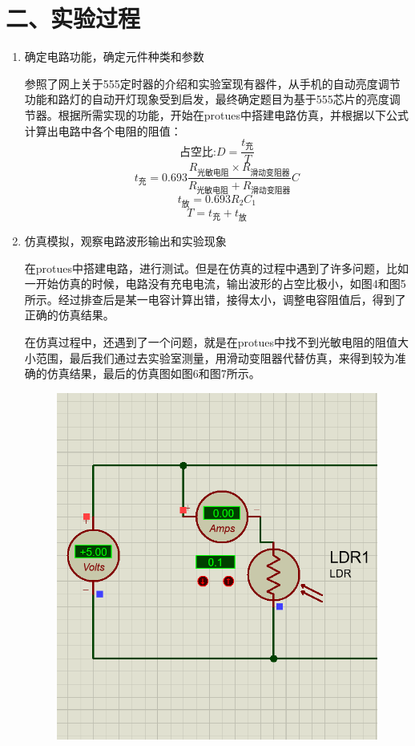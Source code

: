 \documentclass[a4paper,12pt]{article}
\begin{document}
	\section*{二、实验过程}
	\begin{enumerate}
		\item 确定电路功能，确定元件种类和参数\par 
		\qquad 参照了网上关于555定时器的介绍和实验室现有器件，从手机的自动亮度调节功能和路灯的自动开灯现象受到启发，最终确定题目为基于555芯片的亮度调节器。根据所需实现的功能，开始在protues中搭建电路仿真，并根据以下公式计算出电路中各个电阻的阻值：
		$$\mbox{占空比:}D=\frac{t_{\mbox{充}}}{T}$$
		$$t_{\mbox{充}}=0.693\frac{R_{\mbox{光敏电阻}} \times R_{\mbox{滑动变阻器}}}{R_{\mbox{光敏电阻}}+R_{\mbox{滑动变阻器}}}C$$
		\hspace{0.2cm}
		$$t_{\mbox{放}}=0.693R_2C_1$$
		$$T=t_{\mbox{充}}+t_{\mbox{放}}$$
		\item 仿真模拟，观察电路波形输出和实验现象\par 
		\qquad 在protues中搭建电路，进行测试。但是在仿真的过程中遇到了许多问题，比如一开始仿真的时候，电路没有充电电流，输出波形的占空比极小，如图4和图5所示。经过排查后是某一电容计算出错，接得太小，调整电容阻值后，得到了正确的仿真结果。\par 
		\qquad 在仿真过程中，还遇到了一个问题，就是在protues中找不到光敏电阻的阻值大小范围，最后我们通过去实验室测量，用滑动变阻器代替仿真，来得到较为准确的仿真结果，最后的仿真图如图6和图7所示。
		\begin{figure}[h]
			\centering
			\begin{minipage}{0.4\textwidth}
				\centering
				\includegraphics[width=\textwidth]{4.png}

\end{minipage}
\end{figure}
\end{enumerate}
\end{document}
